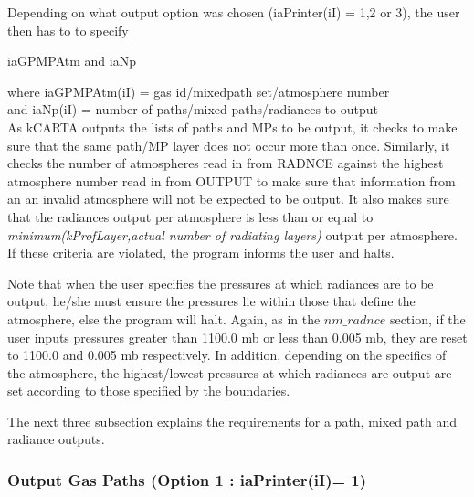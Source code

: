 \documentclass[12pt]{article}
\newcommand{\kc}{\textsf{kCARTA}\xspace}
\begin{document}
{{\noindent Depending on what output option was chosen 
(iaPrinter(iI) = 1,2 or 3), the user then has to to specify 
\begin{center}
{\sf iaGPMPAtm and iaNp   }
\end{center}
\noindent where iaGPMPAtm(iI) = gas id/mixedpath set/atmosphere number\\
\noindent and iaNp(iI) = number of paths/mixed paths/radiances to output\\

As \kc outputs the lists of paths and MPs to be output, it
checks to make sure that the same path/MP layer does not occur more
than once.  Similarly, it checks the number of atmospheres read in
from RADNCE against the highest atmosphere number read in from
OUTPUT to make sure that information from an an invalid atmosphere
will not be expected to be output. It also makes sure that the radiances 
output per atmosphere is less than or equal to {\em minimum(kProfLayer,actual 
number of radiating layers)} output per atmosphere. If these criteria 
are violated, the program informs the user and halts.

Note that when the user specifies the pressures at which radiances
are to be output, he/she must ensure the pressures lie within those
that define the atmosphere, else the program will halt.  Again, as
in the $nm\_radnce$ section, if the user inputs pressures greater than
1100.0 mb or less than 0.005 mb, they are reset to 1100.0 and 0.005
mb respectively.  In addition, depending on the specifics of the
atmosphere, the highest/lowest pressures at which radiances are
output are set according to those specified by the boundaries.

The next three subsection explains the requirements for a path, mixed path 
and radiance outputs. 

\subsubsection{Output Gas Paths (Option 1 : iaPrinter(iI)= 1)}

}}
\end{document}

